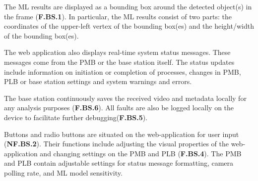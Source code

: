 The ML results are displayed as a bounding box around the detected object(s) in the frame (\textbf{F.BS.1}). In particular, the ML results consist of two parts: the coordinates of the upper-left vertex of the bounding box(es) and the height/width of the bounding box(es).

The web application also displays real-time system status messages. These messages come from the PMB or the base station itself. The status updates include information on initiation or completion of processes, changes in PMB, PLB or base station settings and system warnings and errors.

The base station continuously saves the received video and metadata locally for any analysis purposes (\textbf{F.BS.6}). All faults are also be logged locally on the device to facilitate further debugging(\textbf{F.BS.5}).

Buttons and radio buttons are situated on the web-application for user input (\textbf{NF.BS.2}). Their functions include adjusting the visual properties of the web-application and changing settings on the PMB and PLB (\textbf{F.BS.4}). The PMB and PLB contain adjustable settings for status message formatting, camera polling rate, and ML model sensitivity.
